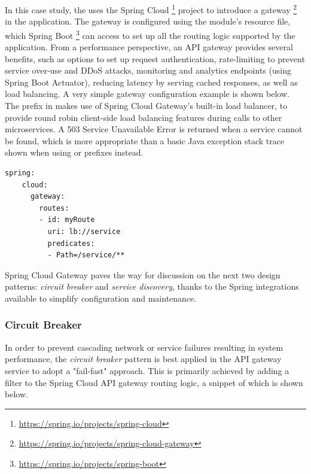In this case study, the  uses the Spring Cloud \footnote{\url{https://spring.io/projects/spring-cloud}} project to introduce a gateway \footnote{\url{https://spring.io/projects/spring-cloud-gateway}} in the application. The gateway is configured using the module's  resource file, which Spring Boot \footnote{\url{https://spring.io/projects/spring-boot}} can access to set up all the routing logic supported by the application. From a performance perspective, an API gateway provides several benefits, such as options to set up request authentication, rate-limiting to prevent service over-use and DDoS attacks, monitoring and analytics endpoints (using Spring Boot Actuator), reducing latency by serving cached responses, as well as load balancing. A very simple gateway configuration example is shown below. The  prefix in  makes use of Spring Cloud Gateway's built-in load balancer, to provide round robin client-side load balancing features during calls to other microservices. A 503 Service Unavailable Error is returned when a service cannot be found, which is more appropriate than a basic Java exception stack trace shown when using  or  prefixes instead.

\begin{lstlisting}[caption=Sample Spring Cloud Gateway configuration]
  spring:
    cloud:
      gateway:
        routes:
        - id: myRoute
          uri: lb://service
          predicates:
          - Path=/service/**
\end{lstlisting}

Spring Cloud Gateway paves the way for discussion on the next two design patterns: \textit{circuit breaker} and \textit{service discovery}, thanks to the Spring integrations available to simplify configuration and maintenance.

\subsubsection{Circuit Breaker}

In order to prevent cascading network or service failures resulting in system performance, the \textit{circuit breaker} pattern is best applied in the API gateway service to adopt a "fail-fast" approach. This is primarily achieved by adding a  filter to the Spring Cloud API gateway routing logic, a snippet of which is shown below.

